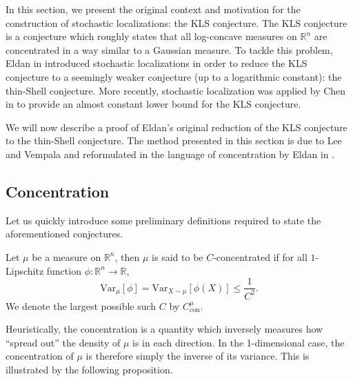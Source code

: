 In this section, we present the original context and motivation for the construction of stochastic 
localizations: the KLS conjecture. The KLS conjecture is a conjecture which roughly states that all 
log-concave measures on \(\mathbb{R}^n\) are concentrated in a way similar to a Gaussian measure. 
To tackle this problem, Eldan in \cite{Eldan_2013} introduced stochastic localizations  
in order to reduce the KLS conjecture to a seemingly weaker conjecture (up to a logarithmic constant): 
the thin-Shell conjecture. More recently, stochastic localization was applied by Chen in \cite{Chen_2020} 
to provide an almost constant lower bound for the KLS conjecture. 

We will now describe a proof of Eldan's original reduction of the KLS conjecture to the thin-Shell conjecture.
The method presented in this section is due to Lee and Vempala \cite{Lee_2016} and reformulated in 
the language of concentration by Eldan in \cite{Eldan_notes}.

\subsection{Concentration}

Let us quickly introduce some preliminary definitions required to state the aforementioned conjectures. 

\begin{definition}
  Let \(\mu\) be a measure on \(\mathbb{R}^n\), then \(\mu\) is said to be \(C\)-concentrated if
  for all \(1\)-Lipschitz function \(\phi : \mathbb{R}^n \to \mathbb{R}\), 
  \begin{equation}
    \text{Var}_\mu[\phi] = \text{Var}_{X \sim \mu}[\phi(X)] \le \frac{1}{C^2}.
  \end{equation}
  We denote the largest possible such \(C\) by \(C^\mu_{\text{con}}\).
\end{definition}

Heuristically, the concentration is a quantity which inversely measures how ``spread out'' the density 
of \(\mu\) is in each direction. In the 1-dimensional case, the concentration of \(\mu\) is therefore 
simply the inverse of its variance. This is illustrated by the following proposition. 

